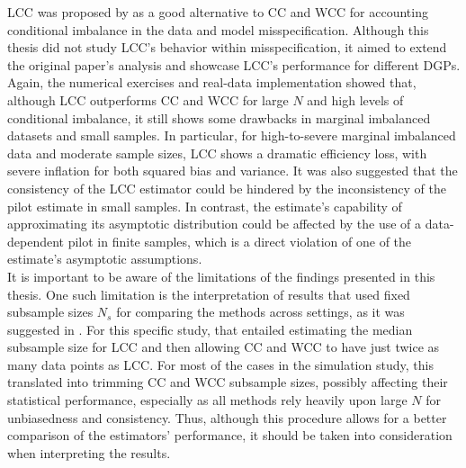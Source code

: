 LCC was proposed by \textcite{hastie2014} as a good alternative to CC and WCC for accounting conditional imbalance in the data and model misspecification. Although this thesis did not study LCC's behavior within misspecification, it aimed to extend the original paper's analysis and showcase LCC's performance for different DGPs. Again, the numerical exercises and real-data implementation showed that, although LCC outperforms CC and WCC for large $N$ and high levels of conditional imbalance, it still shows some drawbacks in marginal imbalanced datasets and small samples. In particular, for high-to-severe marginal imbalanced data and moderate sample sizes, LCC shows a dramatic efficiency loss, with severe inflation for both squared bias and variance. It was also suggested that the consistency of the LCC estimator could be hindered by the inconsistency of the pilot estimate in small samples. In contrast, the estimate's capability of approximating its asymptotic distribution could be affected by the use of a data-dependent pilot in finite samples, which is a direct violation of one of the estimate's asymptotic assumptions.\\

It is important to be aware of the limitations of the findings presented in this thesis. One such limitation is the interpretation of results that used fixed subsample sizes $N_s$ for comparing the methods across settings, as it was suggested in \textcite{hastie2014}. For this specific study, that entailed estimating the median subsample size for LCC and then allowing CC and WCC to have just twice as many data points as LCC. For most of the cases in the simulation study, this translated into trimming CC and WCC subsample sizes, possibly affecting their statistical performance, especially as all methods rely heavily upon large $N$ for unbiasedness and consistency. Thus, although this procedure allows for a better comparison of the estimators' performance, it should be taken into consideration when interpreting the results. \\

